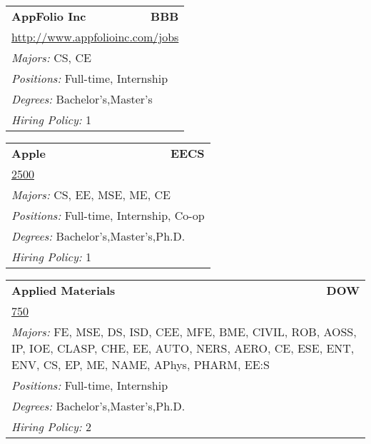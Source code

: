 \documentclass[twoside]{article}
\begin{document}
\begin{center}
\begin{multicols}{3}
\begin{FlushLeft}
\begin{minipage}{.9\columnwidth}
\end{minipage}
 
\begin{minipage}{.9\columnwidth}\begin{tabularx}{.95\columnwidth}{Xr}
                 {\Large\bf AppFolio Inc} & {\Large\bf BBB}\\
    \multicolumn{2}{p{.95\columnwidth}}{\url{http://www.appfolioinc.com/jobs}}\\
    \multicolumn{2}{p{.95\columnwidth}}{\emph{Majors:} CS, CE}\\
    \multicolumn{2}{p{.95\columnwidth}}{\emph{Positions:} Full-time, Internship}\\
    \multicolumn{2}{p{.95\columnwidth}}{\emph{Degrees:} Bachelor's,Master's}\\
    \multicolumn{2}{p{.95\columnwidth}}{\emph{Hiring Policy:} 1}\\
    \end{tabularx}
    
\end{minipage}
 
\begin{minipage}{.9\columnwidth}\begin{tabularx}{.95\columnwidth}{Xr}
                 {\Large\bf Apple} & {\Large\bf EECS}\\
    \multicolumn{2}{p{.95\columnwidth}}{\url{2500}}\\
    \multicolumn{2}{p{.95\columnwidth}}{\emph{Majors:} CS, EE, MSE, ME, CE}\\
    \multicolumn{2}{p{.95\columnwidth}}{\emph{Positions:} Full-time, Internship, Co-op}\\
    \multicolumn{2}{p{.95\columnwidth}}{\emph{Degrees:} Bachelor's,Master's,Ph.D.}\\
    \multicolumn{2}{p{.95\columnwidth}}{\emph{Hiring Policy:} 1}\\
    \end{tabularx}
    
\end{minipage}
 
\begin{minipage}{.9\columnwidth}\begin{tabularx}{.95\columnwidth}{Xr}
                 {\Large\bf Applied Materials} & {\Large\bf DOW}\\
    \multicolumn{2}{p{.95\columnwidth}}{\url{750}}\\
    \multicolumn{2}{p{.95\columnwidth}}{\emph{Majors:} FE, MSE, DS, ISD, CEE, MFE, BME, CIVIL, ROB, AOSS, IP, IOE, CLASP, CHE, EE, AUTO, NERS, AERO, CE, ESE, ENT, ENV, CS, EP, ME, NAME, APhys, PHARM, EE:S}\\
    \multicolumn{2}{p{.95\columnwidth}}{\emph{Positions:} Full-time, Internship}\\
    \multicolumn{2}{p{.95\columnwidth}}{\emph{Degrees:} Bachelor's,Master's,Ph.D.}\\
    \multicolumn{2}{p{.95\columnwidth}}{\emph{Hiring Policy:} 2}\\
    \end{tabularx}
    

\end{minipage}
\end{FlushLeft}
\end{multicols}
\end{center}
\end{document}
